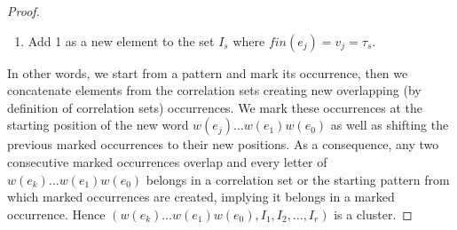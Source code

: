 \documentclass[12pt]{report}
\begin{document}
{{\begin{proof}
\begin{enumerate}[label=\roman{*})]
\item Add 1 as a new element to the set $I_s$ where $fin(e_j)=v_j=\tau_s$.
\end{enumerate}

In other words, we start from a pattern and mark its occurrence, then we concatenate elements from the correlation sets creating new overlapping (by definition of correlation sets) occurrences. We mark these occurrences at the starting position of the new word $w(e_j)\ldots w(e_1) w(e_0)$ as well as shifting the previous marked occurrences to their new positions. As a consequence, any two consecutive marked occurrences overlap and every letter of $w(e_k) \ldots w(e_1) w(e_0)$ belongs in a correlation set or the starting pattern from which marked occurrences are created, implying it belongs in a marked occurrence. Hence $(w(e_k) \ldots w(e_1) w(e_0),I_1,I_2,\ldots,I_r)$ is a cluster.


%
%
%
%


\end{proof}}}
\end{document}
